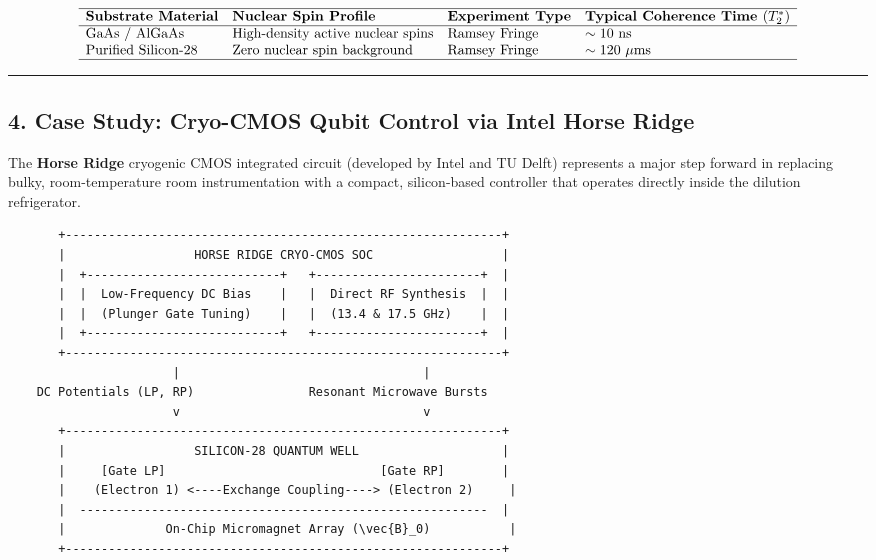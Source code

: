 \documentclass[
]{article}
\begin{document}
\[\begin{array}{llll}
\hline
\textbf{Substrate Material} & \textbf{Nuclear Spin Profile} & \textbf{Experiment Type} & \textbf{Typical Coherence Time } (T_2^*) \\ \hline
\text{GaAs / AlGaAs} & \text{High-density active nuclear spins} & \text{Ramsey Fringe} & \sim 10\ \text{ns} \\
\text{Purified Silicon-28} & \text{Zero nuclear spin background} & \text{Ramsey Fringe} & \sim 120\ \mu\text{ms} \\ \hline
\end{array}\]

\begin{center}\rule{0.5\linewidth}{0.5pt}\end{center}

\subsection{4. Case Study: Cryo-CMOS Qubit Control via Intel Horse
Ridge}\label{case-study-cryo-cmos-qubit-control-via-intel-horse-ridge}

The \textbf{Horse Ridge} cryogenic CMOS integrated circuit (developed by
Intel and TU Delft) represents a major step forward in replacing bulky,
room-temperature room instrumentation with a compact, silicon-based
controller that operates directly inside the dilution refrigerator.

\begin{verbatim}
       +-------------------------------------------------------------+
       |                  HORSE RIDGE CRYO-CMOS SOC                  |
       |  +---------------------------+   +-----------------------+  |
       |  |  Low-Frequency DC Bias    |   |  Direct RF Synthesis  |  |
       |  |  (Plunger Gate Tuning)    |   |  (13.4 & 17.5 GHz)    |  |
       |  +---------------------------+   +-----------------------+  |
       +-------------------------------------------------------------+
                       |                                  |
    DC Potentials (LP, RP)                Resonant Microwave Bursts
                       v                                  v
       +-------------------------------------------------------------+
       |                  SILICON-28 QUANTUM WELL                    |
       |     [Gate LP]                              [Gate RP]        |
       |    (Electron 1) <----Exchange Coupling----> (Electron 2)     |
       |  ---------------------------------------------------------  |
       |              On-Chip Micromagnet Array (\vec{B}_0)           |
       +-------------------------------------------------------------+
\end{verbatim}
\end{document}
